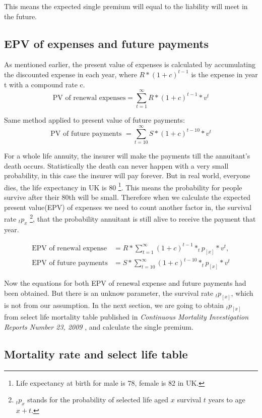 \documentclass{report}
\begin{document}
This means the expected single premium will equal to the liability will meet in the future.




\subsection{EPV of expenses and future payments}

As mentioned earlier, the present value of expenses is calculated by accumulating the discounted expense in each year, where  $R *(1 + c )^{t-1}$ is the expense in year t with a compound rate c.
\[
\text{PV of renewal expenses} = \sum_{t=1}^{\infty} R *(1 + c )^{t-1} *v^t
\]

Same method applied to present value of future payments:
\[
\text{PV of future payments }= \sum_{t=10}^{\infty} S * (1 + c )^{t-10} * v^t 
\]

For a whole life annuity, the insurer will make the payments till the annuitant's death occurs. Statistically the death can never happen with a very small probability, in this case the insurer will pay forever. But in real world, everyone dies, the life expectancy in UK is 80 \footnote{Life expectancy at birth for male is 78, female is 82 in UK.}. This means the probability for people survive after their 80th will be small. Therefore when we calculate the expected present value(EPV) of expenses we need to count another factor in, the survival rate $_tp_x$ \footnote{$_tp_x$ stands for the probability of selected life aged $x$ survival $t$ years to age $x+t$.}, that the probability annuitant is still alive to receive the payment that year.

\begin{align}
        \text{EPV of renewal expense}&= R  * \sum_{t=1}^{\infty}(1 + c )^{t-1} * _tp_{[x]}* v^t,\\
        \text{EPV of future payments}&= S * \sum_{t=10}^{\infty} (1 + c )^{t-10} * _tp_{[x]} * v^t
\end{align}


Now the equations for both EPV of renewal expense and future payments had been obtained. But there is an unknow parameter, the survival rate $_tp_{[x]}$, which is not from our assumption. In the next section, we are going to obtain $_tp_{[x]}$ from select life mortality table published in \textsl{Continuous Mortality Investigation Reports Number 23, 2009} \cite{bib:mortality-report}, and calculate the single premium.

\subsection{Mortality rate and select life table}
\end{document}
